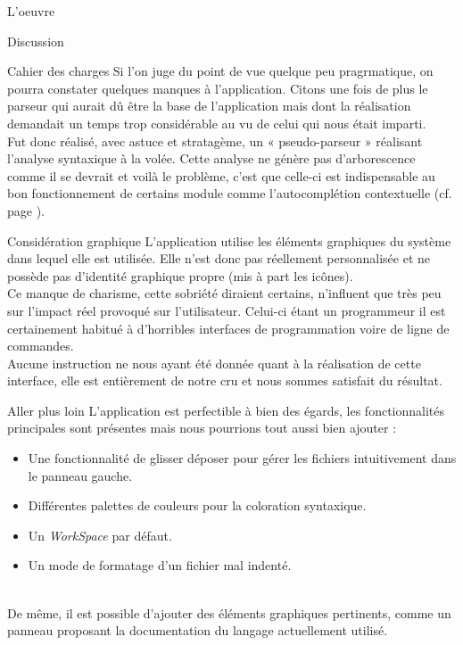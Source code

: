 \documentclass[a4paper, 12pt]{report}
\begin{document}
\begin{part}{L'oeuvre}
\begin{chapter}{Discussion}
\begin{section}{Cahier des charges}
				Si l'on juge du point de vue quelque peu pragrmatique, on pourra constater quelques manques à l'application.
				Citons une fois de plus le \gls{parseur} qui aurait dû être la base de l'application mais dont la réalisation demandait
				un temps trop considérable au vu de	celui qui nous était imparti.\\
				Fut donc réalisé, avec astuce et stratagème, un « pseudo-parseur » réalisant l'analyse syntaxique à la volée. Cette analyse ne génère
				pas d'arborescence comme il se devrait et voilà le problème, c'est que celle-ci est indispensable au bon fonctionnement de certains
				module comme l'\gls{autocomplétion} contextuelle (cf. page \pageref{autocompl}).\\
			\end{section}

			\begin{section}{Considération graphique}
				L'application utilise les éléments graphiques du système dans lequel elle est utilisée. Elle n'est donc pas réellement personnalisée
				et ne possède pas d'identité graphique propre (mis à part les icônes).\\
				Ce manque de charisme, cette sobriété diraient certains, n'influent que très peu sur l'impact réel provoqué sur l'utilisateur.
				Celui-ci étant un programmeur il est certainement habitué à d'horribles interfaces de programmation voire de ligne de commandes.\\


				Aucune instruction ne nous ayant été donnée quant à la réalisation de cette interface, elle est entièrement de notre cru et
				nous sommes satisfait du résultat.
			\end{section}

			\begin{section}{Aller plus loin}
				L'application est perfectible à bien des égards, les fonctionnalités principales sont présentes mais nous pourrions tout aussi
				bien ajouter :
				\begin{itemize}
					\item Une fonctionnalité de glisser déposer pour gérer les fichiers intuitivement dans le panneau gauche.
					\item Différentes palettes de couleurs pour la coloration syntaxique.
					\item Un \emph{WorkSpace} par défaut.
					\item Un mode de formatage d'un fichier mal indenté.
				\end{itemize}~\\

				De même, il est possible d'ajouter des éléments graphiques pertinents, comme un panneau proposant la documentation du langage
				actuellement utilisé.\\
			\end{section}
		\end{chapter}
	\end{part}
\end{document}

